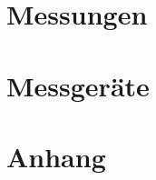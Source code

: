 \documentclass[a4paper,10pt,fleqn]{article}
\begin{document}





\section{Messungen}















%
%



\section{Messgeräte}




\clearpage
\section{Anhang}
\appendix

\end{document}
